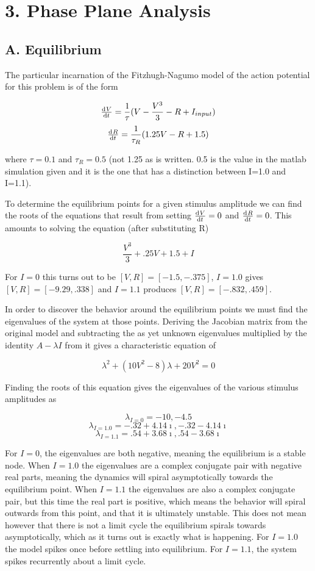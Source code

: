 \documentclass[12pt]{article}
\begin{document}
\maketitle

\section{3. Phase Plane Analysis}

\subsection{A. Equilibrium}

The particular incarnation of the Fitzhugh-Nagumo model of the action potential for this problem is of the form

$$ \od{V}{t}=\frac{1}{\tau}(V-\frac{V^3}{3}-R+I_{input}) $$
$$ \od{R}{t}=\frac{1}{\tau_R}(1.25V-R+1.5) $$

where $\tau=0.1$ and $\tau_R=0.5$ (not 1.25 as is written.  0.5 is the value in the matlab simulation given and it is the one that has a distinction between I=1.0 and I=1.1).  

To determine the equilibrium points for a given stimulus amplitude we can find the roots of the equations that result from setting $\od{V}{t}=0$ and $\od{R}{t}=0$.  This amounts to solving the equation (after substituting R)

$$ \frac{V^3}{3}+.25V+1.5+I $$

For $I=0$ this turns out to be $[V,R]=[-1.5,-.375]$, $I=1.0$ gives $[V,R]=[-9.29,.338]$ and $I=1.1$ produces $[V,R]=[-.832,.459]$.  

In order to discover the behavior around the equilibrium points we must find the eigenvalues of the system at those points.  Deriving the Jacobian matrix from the original model and subtracting the as yet unknown eigenvalues multiplied by the identity $A-\lambda I$ from it gives a characteristic equation of 

$$ \lambda^2+(10V^2-8)\lambda+20V^2=0 $$

Finding the roots of this equation gives the eigenvalues of the various stimulus amplitudes as

$$ \lambda_{I=0}=-10,-4.5 $$
$$ \lambda_{I=1.0}=-.32+4.14\imath,-.32-4.14\imath $$
$$ \lambda_{I=1.1}=.54+3.68\imath,.54-3.68\imath $$

For $I=0$, the eigenvalues are both negative, meaning the equilibrium is a stable node.  When $I=1.0$ the eigenvalues are a complex conjugate pair with negative real parts, meaning the dynamics will spiral asymptotically towards the equilibrium point.  When $I=1.1$ the eigenvalues are also a complex conjugate pair, but this time the real part is positive, which means the behavior will spiral outwards from this point, and that it is ultimately unstable.  This does not mean however that there is not a limit cycle the equilibrium spirals towards asymptotically, which as it turns out is exactly what is happening.  For $I=1.0$ the model spikes once before settling into equilibrium.  For $I=1.1$, the system spikes recurrently about a limit cycle.
\end{document}

